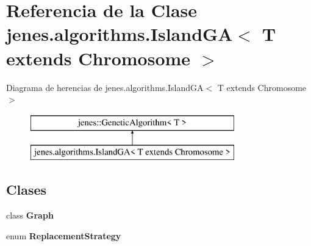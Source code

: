 \hypertarget{classjenes_1_1algorithms_1_1_island_g_a_3_01_t_01extends_01_chromosome_01_4}{\section{Referencia de la Clase jenes.\-algorithms.\-Island\-G\-A$<$ T extends Chromosome $>$}
\label{classjenes_1_1algorithms_1_1_island_g_a_3_01_t_01extends_01_chromosome_01_4}
}
Diagrama de herencias de jenes.\-algorithms.\-Island\-G\-A$<$ T extends Chromosome $>$\begin{figure}[H]
\begin{center}
\leavevmode
\includegraphics[height=2.000000cm]{classjenes_1_1algorithms_1_1_island_g_a_3_01_t_01extends_01_chromosome_01_4}
\end{center}
\end{figure}
\subsection*{Clases}
\begin{DoxyCompactItemize}
\item 
class {\bfseries Graph}
\item 
enum {\bfseries Replacement\-Strategy}
\end{DoxyCompactItemize}
